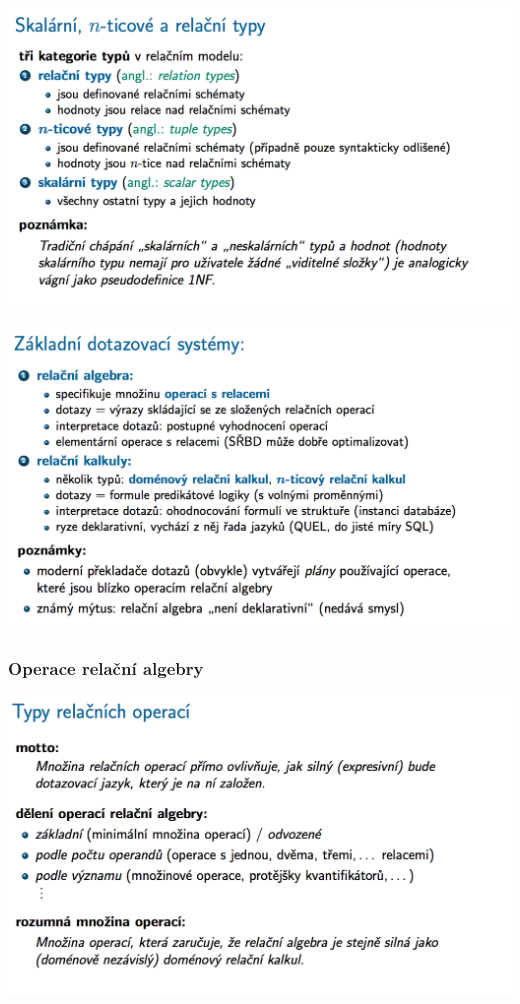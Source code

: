 \documentclass[10pt,a4paper]{article}
\begin{document}
	\includegraphics[scale=0.4]{img/17}
	
	\includegraphics[scale=0.4]{img/18}

\subsubsection{Operace relační algebry}
	\includegraphics[scale=0.4]{img/20}
	
\end{document}
